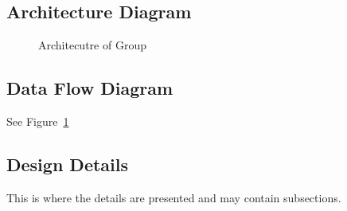 \subsection{ Architecture  Diagram}
\begin{figure}[tbh!]
	\begin{center}
	\end{center}
	\caption{Architecutre of Group \label{ArchitecutreofGroup}}
	\end{figure}


\subsection{Data Flow Diagram}
See Figure~\ref{ArchitecutreofGroup}


\subsection{Design Details}
This is where the details are presented and may contain subsections. 


